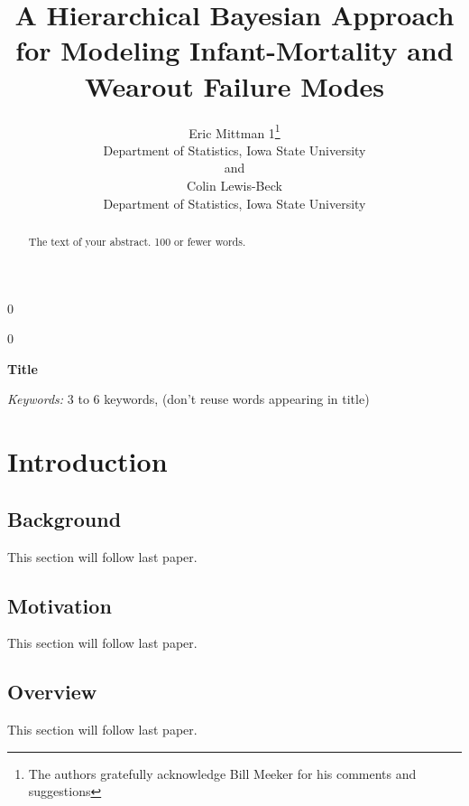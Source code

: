 \documentclass[12pt]{article}
\newcommand{\blind}{0}
\begin{document}
%

\def\spacingset#1{\renewcommand{\baselinestretch}%
{#1}\small\normalsize} \spacingset{1}



\blind
{
  \title{\bf A Hierarchical Bayesian Approach for Modeling Infant-Mortality and Wearout Failure Modes}
  \author{Eric Mittman 1\thanks{
    The authors gratefully acknowledge Bill Meeker for his comments and suggestions}\hspace{.2cm}\\
    Department of Statistics, Iowa State University\\
    and \\
    Colin Lewis-Beck \\
    Department of Statistics, Iowa State University}
  \maketitle
} \fi

\blind
{
  \bigskip
  \bigskip
  \bigskip
  \begin{center}
    {\LARGE\bf Title}
\end{center}
  \medskip
} \fi

\bigskip
\begin{abstract}
The text of your abstract.  100 or fewer words.
\end{abstract}

\noindent%
{\it Keywords:}  3 to 6 keywords, (don't reuse words appearing in title)
\vfill

\newpage
\spacingset{1.45} %
\section{Introduction}
\subsection{Background}
This section will follow last paper.
 
\subsection{Motivation}
This section will follow last paper.

\subsection{Overview}
This section will follow last paper.
\end{document}
